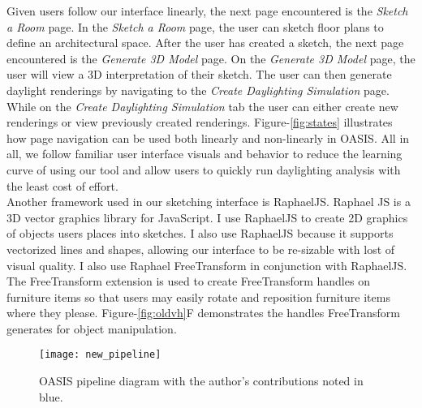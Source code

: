 		Given users follow our interface linearly, the next page encountered is the \textit{Sketch a Room} page. 
		In the \textit{Sketch a Room} page, the user can sketch floor plans to define an architectural space.
		After the user has created a sketch, the next page encountered is the \textit{Generate 3D Model} page. 
		On the \textit{Generate 3D Model} page, the user will view a 3D interpretation of their sketch. 
		The user can then generate daylight renderings by navigating to the \textit{Create Daylighting Simulation} page.
		While on the \textit{Create Daylighting Simulation} tab the user can either create new renderings or view previously created renderings.
		Figure-\ref{fig:states} illustrates how page navigation can be used both linearly and non-linearly in OASIS.
		All in all, we follow familiar user interface visuals and behavior to reduce the learning curve of using our tool and allow users to quickly run daylighting analysis with the least cost of effort.\\

		Another framework used in our sketching interface is RaphaelJS\cite{}.
		Raphael JS is a 3D vector graphics library for JavaScript. 
		I use RaphaelJS to create 2D graphics of objects users places into sketches. I also use RaphaelJS because it supports vectorized lines and shapes, allowing our interface  to be re-sizable with lost of visual quality.
		I also use Raphael FreeTransform in conjunction with RaphaelJS\cite{}. 
		The FreeTransform extension is used to create FreeTransform handles on furniture items so that users may easily rotate and reposition furniture items where they please.
		Figure-\ref{fig:oldvh}F demonstrates the handles FreeTransform generates for object manipulation.\\

		\begin{figure}[h]
		\centering
		\texttt{[image: new\_pipeline]}
		\caption{OASIS pipeline diagram with the author's contributions noted in blue.}
		\label{fig:new_pipeline}
		\end{figure}

